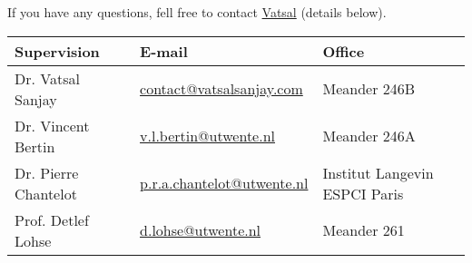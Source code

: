 \documentclass[a4paper,10pt]{article}
\begin{document}
If you have any questions, fell free to contact \href{mailto:contact@vatsalsanjay.com}{Vatsal} (details below).
\begin{center}
\begin{tabular}{|l|l|l|}
\hline \textbf{Supervision} & \textbf{E-mail} & \textbf{Office} \\
\hline Dr. Vatsal Sanjay & \href{mailto:v.sanjay@utwente.nl}{contact@vatsalsanjay.com} & Meander 246B \\
\hline Dr. Vincent Bertin & \href{mailto:v.l.bertin@utwente.nl}{v.l.bertin@utwente.nl}&Meander 246A\\
\hline Dr. Pierre Chantelot   & \href{mailto:p.r.a.chantelot@utwente.nl}{p.r.a.chantelot@utwente.nl}& Institut Langevin ESPCI Paris\\
\hline Prof. Detlef Lohse & \href{mailto:d.lohse@utwente.nl}{d.lohse@utwente.nl} & Meander 261  \\
\hline
\end{tabular}
\end{center}

\printbibliography
\end{document}

